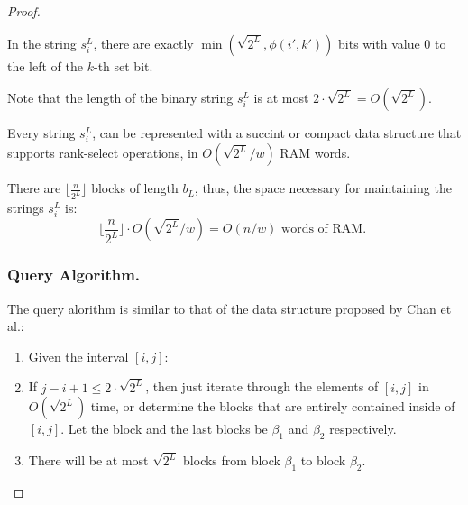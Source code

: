 \documentclass[runningheads]{llncs}
\begin{document}
\begin{proof}
\begin{definition}
\begin{property}
            In the string $s_i^L$, there are exactly $\min(\sqrt{2^L}, \phi(i',k') )$ bits with value $0$ to the left of the $k$-th set bit. 
        
        \end{property}

    \end{definition}
    
    Note that the length of the binary string $s_i^L$ is at most $ 2\cdot \sqrt{2^L} = O(\sqrt{2^L})$.
    
    Every string $s_i^L$, can be represented with a succint or compact data structure that supports rank-select operations, in $O(\sqrt{2^L}/w)$ RAM words.
    
    There are $\lfloor \frac{n}{2^L} \rfloor$ blocks of length $b_L$, thus, the space necessary for maintaining the strings $s_i^L$ is:
    \[
        \lfloor \frac{n}{2^L} \rfloor \cdot O(\sqrt{2^L}/w) = O(n/w) \text{ words of RAM. }
    \]


    \subsubsection{Query Algorithm.} The query alorithm is similar to that of the data structure proposed by Chan et al.\cite{chan2014linear}:

    \begin{enumerate}
        \item[] Given the interval $[i,j]$:
        \item If $j-i+1\leq 2\cdot \sqrt{2^L}$, then just iterate through the elements of $[i,j]$ in $O(\sqrt{2^L})$ time, or determine the blocks that are entirely contained inside of $[i,j]$.
         Let the block and the last blocks be $\beta_1$ and $\beta_2$ respectively.  
        \item There will be at most $\sqrt{2^L}$ blocks from block $\beta_1$ to block $\beta_2$.
        

\end{enumerate}
\end{proof}
\end{document}
